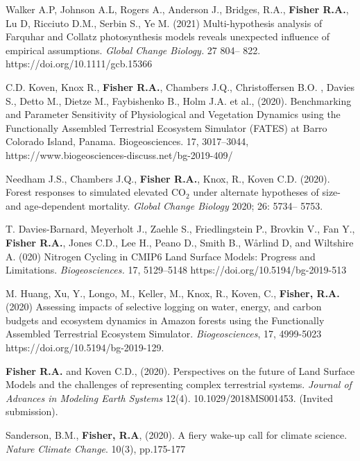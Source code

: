 \documentclass[10pt]{article}
\newenvironment{lonelist}[1][\enskip\textbullet]%
        {\vspace{-\baselineskip}\begin{list}{#1}{%
        \setlength{\itemindent}{-3pt} 
        \setlength{\partopsep}{0pt}%
        \setlength{\leftmargin}{10pt}
        \setlength{\topsep}{15pt}}}
        {\end{list}\vspace{-.3\baselineskip}}
\begin{document}
\begin{lonelist}
 \item [58]  Walker A.P, Johnson A.L, Rogers A., Anderson J., Bridges, R.A., \textbf{Fisher R.A.}, Lu D, Ricciuto D.M., Serbin S., Ye M.  (2021)  Multi-hypothesis analysis of Farquhar and Collatz photosynthesis models reveals unexpected influence of empirical assumptions.  \emph{Global Change Biology.} 27 804– 822. https://doi.org/10.1111/gcb.15366 
 
 \item [57] C.D. Koven, Knox R., \textbf{Fisher R.A.}, Chambers J.Q., Christoffersen B.O. , Davies S., Detto M., Dietze M., Faybishenko B., Holm J.A. et al., (2020). Benchmarking and Parameter Sensitivity of Physiological and Vegetation Dynamics using the Functionally Assembled Terrestrial Ecosystem Simulator (FATES) at Barro Colorado Island, Panama. Biogeosciences. 17, 3017–3044, https://www.biogeosciences-discuss.net/bg-2019-409/

\item [56]  Needham J.S., Chambers J.Q., \textbf{Fisher R.A.}, Knox, R., Koven C.D.  (2020). Forest responses to simulated elevated CO$_2$ under alternate hypotheses of size- and age-dependent mortality.  \emph{Global Change Biology } 2020; 26: 5734– 5753. 

\item[55] { T. Davies-Barnard, Meyerholt J., Zaehle S., Friedlingstein P., Brovkin V., Fan Y., \textbf{Fisher R.A.},  Jones C.D., Lee H., Peano D., Smith B., Wårlind D, and Wiltshire A. (020) Nitrogen Cycling in CMIP6 Land Surface Models: Progress and Limitations.  \emph{Biogeosciences.} 17, 5129–5148 https://doi.org/10.5194/bg-2019-513}

\item[54]  M. Huang, Xu, Y., Longo, M., Keller, M., Knox, R., Koven, C., \textbf{Fisher, R.A.} (2020) Assessing impacts of selective logging on water, energy, and carbon budgets and ecosystem dynamics in Amazon forests using the Functionally Assembled Terrestrial Ecosystem Simulator. \emph{Biogeosciences}, 17, 4999-5023  https://doi.org/10.5194/bg-2019-129.

\item[53] {\textbf{Fisher R.A.} and Koven C.D., (2020).  Perspectives on the future of Land Surface Models and the challenges of representing complex terrestrial systems.  \emph{Journal of Advances in Modeling Earth Systems} 12(4). 10.1029/2018MS001453. (Invited submission).}

\item[52]   Sanderson, B.M., \textbf{Fisher, R.A},  (2020). A fiery wake-up call for climate science. \emph{Nature Climate Change}. 10(3), pp.175-177


\end{lonelist}
\end{document}
